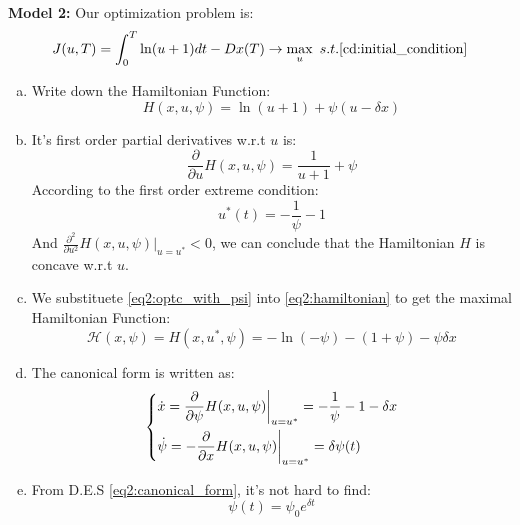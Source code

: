 
{\bf Model 2:} Our optimization problem is:
\begin{equation}
    J(u,T)=\int_{0}^{T}\ln (u+1)dt-Dx(T)\rightarrow \max_{u}\ s.t. \eqref{cd:initial_condition}
\end{equation}
\begin{enumerate}[a)]
    \item Write down the Hamiltonian Function:
            \begin{equation}\label{eq2:hamiltonian}
                H(x,u,\psi)=\ln (u+1)+\psi (u-\delta x)
            \end{equation}
    \item It's first order partial derivatives w.r.t $u$ is:
            \begin{equation}
                \frac{\partial }{\partial u}H(x,u,\psi)=\frac{1}{u+1}+\psi
            \end{equation}
             According to the first order extreme condition:
             \begin{equation}\label{eq2:optc_with_psi}
                u^*(t)=-\frac{1}{\psi}-1
             \end{equation}
             And $\frac{\partial^2 }{\partial u^2}H(x,u,\psi)\big|_{u=u^*}<0$, we can conclude that the Hamiltonian $H$ is concave w.r.t $u$.
    \item We substituete \eqref{eq2:optc_with_psi} into \eqref{eq2:hamiltonian} to get the maximal Hamiltonian Function:
             \begin{equation}
                \mathcal{H}(x, \psi)=H(x,u^*,\psi)=-\ln(-\psi)-(1+\psi)-\psi\delta x
             \end{equation}
    \item The canonical form is written as:
             \begin{equation}\label{eq2:canonical_form}
                 \begin{dcases}
                    \dot{x}= \frac{\partial }{\partial \psi}H(x,u,\psi)\bigg|_{u=u^*}=-\frac{1}{\psi}-1-\delta x\\
                    \dot{\psi}=-\frac{\partial }{\partial x}H(x,u,\psi)\bigg|_{u=u^*}=\delta \psi(t)
                \end{dcases}
             \end{equation}
    \item From D.E.S \eqref{eq2:canonical_form}, it's not hard to find:
             \begin{equation}\label{eq2:psi_with_psi0}
                 \psi(t)=\psi_0 e^{\delta t}

\end{equation}
\end{enumerate}
